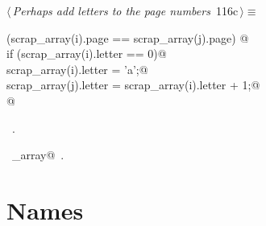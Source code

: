 \documentclass[a4paper]{report}
\begin{document}
\begin{flushleft} \small
\begin{minipage}{\linewidth}\label{scrap248}\raggedright\small
{} $\langle\,${\it Perhaps add letters to the page numbers}\nobreak\ {\footnotesize {116c}}$\,\rangle\equiv$
\vspace{-1ex}
\begin{list}{}{} \item
\mbox{}\verb@if (scrap_array(i).page == scrap_array(j).page) {@\\
\mbox{}\verb@   if (scrap_array(i).letter == 0)@\\
\mbox{}\verb@      scrap_array(i).letter = 'a';@\\
\mbox{}\verb@   scrap_array(j).letter = scrap_array(i).letter + 1;@\\
\mbox{}\verb@}@\\
\mbox{}\verb@@{\NWsep}
\end{list}
\vspace{-1.5ex}
\footnotesize
\begin{list}{}{\setlength{\itemsep}{-\parsep}\setlength{\itemindent}{-\leftmargin}}
\item \NWtxtMacroRefIn\ .
\item \NWtxtIdentsUsed\nobreak\  \verb@scrap_array@\nobreak\ .
\item{}
\end{list}
\end{minipage}\vspace{4ex}
\end{flushleft}
\section{Names} \label{names}
\end{document}
